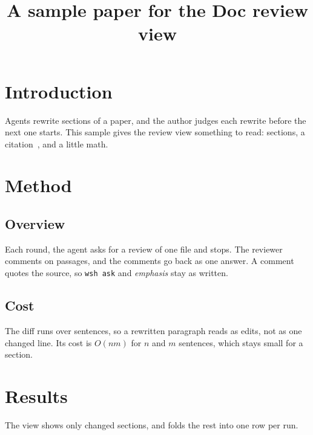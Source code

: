 \documentclass{article}
\title{A sample paper for the Doc review view}
\begin{document}
\maketitle

\section{Introduction}

Agents rewrite sections of a paper, and the author judges each rewrite before the next one starts.
This sample gives the review view something to read: sections, a citation~\cite{knuth84}, and a little math.

\section{Method}

\subsection{Overview}

Each round, the agent asks for a review of one file and stops.
The reviewer comments on passages, and the comments go back as one answer.
A comment quotes the source, so \texttt{wsh ask} and \emph{emphasis} stay as written.

\subsection{Cost}

The diff runs over sentences, so a rewritten paragraph reads as edits, not as one changed line.
Its cost is $O(nm)$ for $n$ and $m$ sentences, which stays small for a section.

\section{Results}

The view shows only changed sections, and folds the rest into one row per run.
\end{document}

